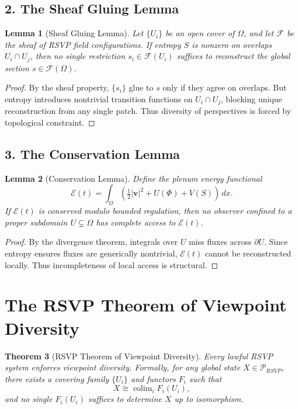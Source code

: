\documentclass[a4paper,11pt,openany]{book}
\newtheorem{theorem}{Theorem}[section]
\newtheorem{lemma}[theorem]{Lemma}
\begin{document}
\subsection*{2. The Sheaf Gluing Lemma}

\begin{lemma}[Sheaf Gluing Lemma]
Let $\{U_i\}$ be an open cover of $\Omega$, and let $\mathcal{F}$ be the sheaf of RSVP field configurations. 
If entropy $S$ is nonzero on overlaps $U_i \cap U_j$, then no single restriction $s_i \in \mathcal{F}(U_i)$ suffices to reconstruct the global section $s \in \mathcal{F}(\Omega)$. 
\end{lemma}

\begin{proof}
By the sheaf property, $\{s_i\}$ glue to $s$ only if they agree on overlaps.  
But entropy introduces nontrivial transition functions on $U_i \cap U_j$, 
blocking unique reconstruction from any single patch.  
Thus diversity of perspectives is forced by topological constraint.  
\end{proof}

\subsection*{3. The Conservation Lemma}

\begin{lemma}[Conservation Lemma]
Define the plenum energy functional
\[
\mathcal{E}(t) = \int_\Omega \left(\tfrac{1}{2}|\mathbf{v}|^2 + U(\Phi) + V(S)\right)\, dx.
\]
If $\mathcal{E}(t)$ is conserved modulo bounded regulation, then no observer confined to a proper subdomain $U \subsetneq \Omega$ has complete access to $\mathcal{E}(t)$. 
\end{lemma}

\begin{proof}
By the divergence theorem, integrals over $U$ miss fluxes across $\partial U$.  
Since entropy ensures fluxes are generically nontrivial, $\mathcal{E}(t)$ 
cannot be reconstructed locally. Thus incompleteness of local access is structural.  
\end{proof}

\section{The RSVP Theorem of Viewpoint Diversity}

\begin{theorem}[RSVP Theorem of Viewpoint Diversity]
Every lawful RSVP system enforces viewpoint diversity. 
Formally, for any global state $X \in \mathcal{P}_{RSVP}$, there exists a covering family $\{U_i\}$ and functors $F_i$ such that
\[
X \cong \operatorname{colim}_i F_i(U_i),
\]
and no single $F_i(U_i)$ suffices to determine $X$ up to isomorphism.
\end{theorem}
\end{document}
